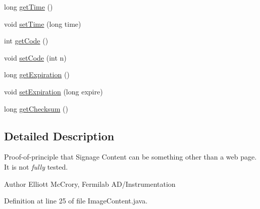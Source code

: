 \begin{DoxyCompactItemize}
\item 
long \hyperlink{classgov_1_1fnal_1_1ppd_1_1dd_1_1channel_1_1ImageContent_a02f8f320ee14917afb0fb94f7802c890}{get\-Time} ()
\item 
void \hyperlink{classgov_1_1fnal_1_1ppd_1_1dd_1_1channel_1_1ImageContent_af78af6af95d883037423fca35cf113a5}{set\-Time} (long time)
\item 
int \hyperlink{classgov_1_1fnal_1_1ppd_1_1dd_1_1channel_1_1ImageContent_a7a0feeabd65ee32a3f305c42aad14f5e}{get\-Code} ()
\item 
void \hyperlink{classgov_1_1fnal_1_1ppd_1_1dd_1_1channel_1_1ImageContent_a4e30385a6fa6c69884dd5f00c4b19f56}{set\-Code} (int n)
\item 
long \hyperlink{classgov_1_1fnal_1_1ppd_1_1dd_1_1channel_1_1ImageContent_a10f6c4c72d605566ec089752e734d81b}{get\-Expiration} ()
\item 
void \hyperlink{classgov_1_1fnal_1_1ppd_1_1dd_1_1channel_1_1ImageContent_ae6c23a8415f978cb4ccbb2b20f53648b}{set\-Expiration} (long expire)
\item 
long \hyperlink{classgov_1_1fnal_1_1ppd_1_1dd_1_1channel_1_1ImageContent_ae27f0af45c0765c05eaaac6ff59048ea}{get\-Checksum} ()
\end{DoxyCompactItemize}


\subsection{Detailed Description}
Proof-\/of-\/principle that Signage Content can be something other than a web page. It is not {\itshape fully} tested.

\begin{DoxyAuthor}{Author}
Elliott Mc\-Crory, Fermilab A\-D/\-Instrumentation 
\end{DoxyAuthor}


Definition at line 25 of file Image\-Content.\-java.



